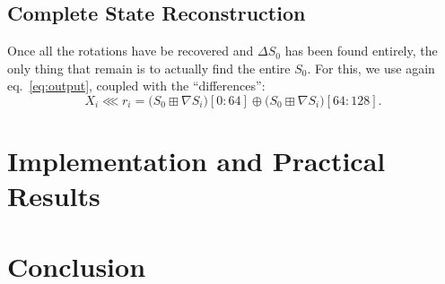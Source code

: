 \documentclass[preprint,svgnames]{iacrtrans}
\begin{document}
\subsection{Complete State Reconstruction}

Once all the rotations have be recovered and $\Delta S_0$ has been found
entirely, the only thing that remain is to actually find the entire $S_0$. For
this, we use again eq.~\eqref{eq:output}, coupled with the ``differences'':
\[
  X_i  \lll r_i = \bigl(S_0 \boxplus \nabla S_i)[0:64] \oplus \bigl(S_0 \boxplus \nabla S_i)[64:128].
\]

\section{Implementation and Practical Results}
\label{sec:implem}

\section{Conclusion}




\end{document}
